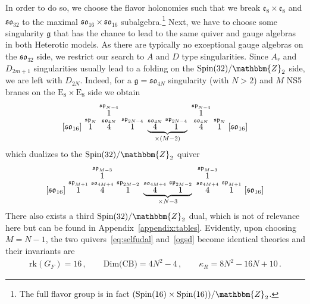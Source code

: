 \documentclass[11pt]{article}
\numberwithin{equation}{section}
\newcommand\myoverset[2]{\overset{\textstyle #1\mathstrut}{#2}}
\newcommand{\fso}{\mathfrak{so}}
\newcommand{\fg}{\mathfrak{g}}
\newcommand{\fe}{\mathfrak{e}}
\begin{document}
In order to do so, we choose the flavor holonomies such that we break $\fe_8\times\fe_8$ and $\fso_{32}$ to the maximal $\fso_{16}\times \fso_{16}$ subalgebra.\footnote{The full flavor group is in fact $(\text{Spin}(16) \times \text{Spin}(16))/\mathbbm{Z}_2$.} Next, we have to choose some singularity $\fg$ that has the chance to lead to the same quiver and gauge algebras in both Heterotic models. As there are typically no exceptional gauge algebras on the $\fso_{32}$ side, we restrict our search to $A$ and $D$ type singularities.
Since $A_r$ and $D_{2m+1}$ singularities usually lead to a folding on the $\text{Spin}(32)/\mathbbm{Z}_2$ side, we are left with $D_{2N}$. Indeed, for a $\fg=\fso_{4N}$ singularity (with $N>2$) and $M$ NS5 branes on the $\text{E}_8\times \text{E}_8$ side
we obtain 
\begin{align}
\label{ogsd}
    \lbrack  \mathfrak{so}_{16}\rbrack     \, \,   
{\overset{\mathfrak{sp}_{N}}{1}}   \, \,  
\myoverset{{\overset{\mathfrak{sp}_{N-4}}{1}}}
{\overset{\mathfrak{so}_{4N}}{4}}  \, \,
{\overset{\mathfrak{sp}_{2N-4}}{1}} \, \, 
\underbrace{{\overset{\mathfrak{so}_{4N}}{4}} \, \,
{\overset{\mathfrak{sp}_{2N-4}}{1}}}_{\times (M-2)}  \, \,
\myoverset{{\overset{\mathfrak{sp}_{N-4}}{1}}}
{\overset{\mathfrak{so}_{4N}}{4}} \, \,
{\overset{\mathfrak{sp}_{N}}{1}}  \, \,
\lbrack \mathfrak{so}_{16} \rbrack 
\end{align}
which dualizes to the $\text{Spin}(32)/\mathbbm{Z}_2$ quiver
\begin{align}
\label{eq:selfudal}
    \lbrack  \mathfrak{so}_{16}\rbrack     \, \,   
{\overset{\mathfrak{sp}_{M+1}}{1}}   \, \,  
\myoverset{\overset{\mathfrak{sp}_{M-3}}{1}}
{\overset{\mathfrak{so}_{4M+4}}{4}} \, \, 
{\overset{\mathfrak{sp}_{2M-2}}{1}}  \, \,
\underbrace{{\overset{\mathfrak{so}_{4M+4}}{4}} \, \, 
{\overset{\mathfrak{sp}_{2M-2}}{1}}}_{\times N-3} \, \, 
\myoverset{\overset{\mathfrak{sp}_{M-3}}{1}}
{\overset{\mathfrak{so}_{4M+4}}{4}} \, \, 
{\overset{\mathfrak{sp}_{M+1}}{1}} \, \,
\lbrack \mathfrak{so}_{16} \rbrack
\end{align}
There also exists a third $\text{Spin}(32)/\mathbbm{Z}_2$ dual, which is not of relevance here but can be found in Appendix~\ref{appendix:tables}. 
Evidently, upon choosing $M=N-1$, the two quivers~\eqref{eq:selfudal} and~\eqref{ogsd} become identical theories and their invariants are
\begin{align}
 \text{rk}(G_F)=16\, , \qquad     \text{Dim(CB)}= 4 N^2-4\, , \qquad \kappa_{R}= 8 N^2 - 16 N+ 10  \, .
\end{align} 
\end{document}

